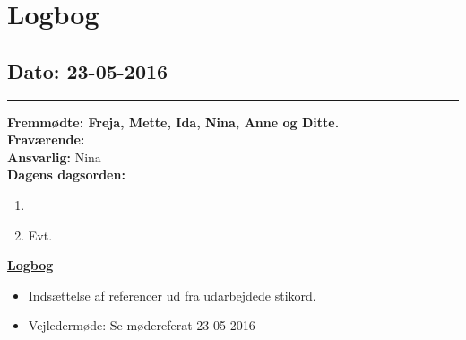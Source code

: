 \chapter{Logbog}
\section{Dato: 23-05-2016}
\hrule
\textbf{Fremmødte: Freja, Mette, Ida, Nina, Anne og Ditte.} \\
\textbf{Fraværende: } \\
\textbf{Ansvarlig:} Nina  \\
\textbf{Dagens dagsorden: }
\begin{enumerate}
	\item 
	\item Evt. 
\end{enumerate}

\underline{\textbf{Logbog}}
\begin{itemize}
\item Indsættelse af referencer ud fra udarbejdede stikord.
\item Vejledermøde: Se mødereferat 23-05-2016
\end{itemize}

\newpage
